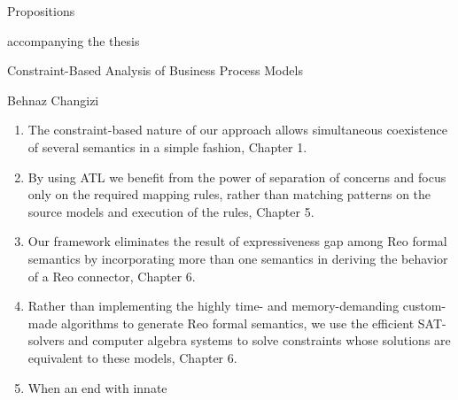 \begin{center}{\large{Propositions}}\end{center}
\begin{center}accompanying the thesis\end{center}

\vspace*{.5cm}
\begin{center}{\Large{Constraint-Based Analysis of Business Process Models}}\end{center}

\begin{center}Behnaz Changizi\end{center}
\vspace*{1cm}
\begin{enumerate}
\item The constraint-based nature of our approach
allows simultaneous coexistence of several semantics in a simple fashion, Chapter 1.
\item By using ATL we benefit from the power of separation of concerns and focus
only on the required mapping rules, rather than matching patterns on the source
models and execution of the rules, Chapter 5.
\item Our framework eliminates the result of expressiveness gap among Reo formal
semantics by incorporating more than one semantics in deriving the behavior
of a Reo connector, Chapter 6.
\item Rather than implementing the highly time- and memory-demanding
custom-made algorithms to generate Reo formal semantics, we use the efficient
SAT-solvers and computer algebra systems to solve constraints whose solutions
are equivalent to these models, Chapter 6.
\item When an end with innate

\end{enumerate}
